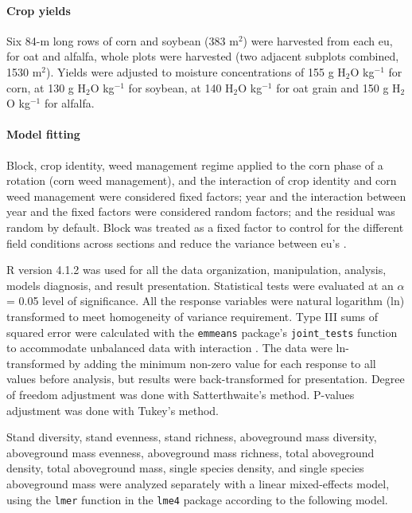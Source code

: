 \documentclass[
]{article}
\begin{document}
\hypertarget{crop-yields}{%
\paragraph*{Crop yields}\label{crop-yields}}

Six 84-m long rows of corn and soybean (383 m\(^2\)) were harvested from each eu, for oat and alfalfa, whole plots were harvested (two adjacent subplots combined, 1530 m\(^2\)). Yields were adjusted to moisture concentrations of 155 g H\(_2\)O kg\(^{-1}\) for corn, at 130 g H\(_2\)O kg\(^{-1}\) for soybean, at 140 H\(_2\)O kg\(^{-1}\) for oat grain and 150 g H\(_2\)O kg\(^{-1}\) for alfalfa.

\hypertarget{model-fitting}{%
\paragraph*{Model fitting}\label{model-fitting}}

Block, crop identity, weed management regime applied to the corn phase of a rotation (corn weed management), and the interaction of crop identity and corn weed management were considered fixed factors; year and the interaction between year and the fixed factors were considered random factors; and the residual was random by default. Block was treated as a fixed factor to control for the different field conditions across sections and reduce the variance between eu's \citep{dixonShouldBlocksBe2016}.

R version 4.1.2 \citep{rdevelopmentcoreteamLanguageEnvironmentStatistical2021} was used for all the data organization, manipulation, analysis, models diagnosis, and result presentation. Statistical tests were evaluated at an \(\alpha\) = 0.05 level of significance. All the response variables were natural logarithm (ln) transformed to meet homogeneity of variance requirement. Type III sums of squared error were calculated with the \texttt{emmeans} package's \texttt{joint\_tests} function to accommodate unbalanced data with interaction \citep[version 1.7.1-1,][]{lenthEmmeansEstimatedMarginal2021}. The data were ln-transformed by adding the minimum non-zero value for each response to all values before analysis, but results were back-transformed for presentation. Degree of freedom adjustment was done with Satterthwaite's method. P-values adjustment was done with Tukey's method.

Stand diversity, stand evenness, stand richness, aboveground mass diversity, aboveground mass evenness, aboveground mass richness, total aboveground density, total aboveground mass, single species density, and single species aboveground mass were analyzed separately with a linear mixed-effects model, using the \texttt{lmer} function in the \texttt{lme4} package \citep[version 1.1-27.1,][]{batesLme4LinearMixedEffects2021} according to the following model.
\end{document}

